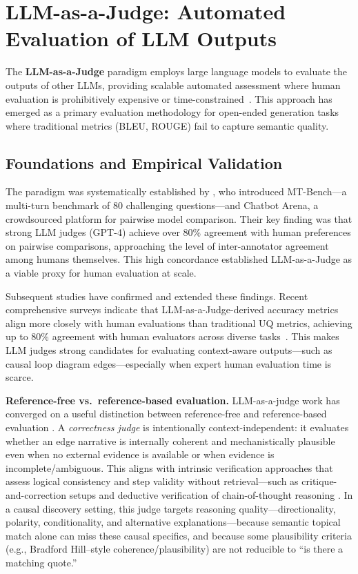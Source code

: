 
\section{LLM-as-a-Judge: Automated Evaluation of LLM Outputs}
\label{sec:lit_llm_as_judge}

The \textbf{LLM-as-a-Judge} paradigm employs large language models to evaluate the outputs of other LLMs, providing scalable automated assessment where human evaluation is prohibitively expensive or time-constrained~\citep{zheng2024judging}. This approach has emerged as a primary evaluation methodology for open-ended generation tasks where traditional metrics (BLEU, ROUGE) fail to capture semantic quality.

\subsection{Foundations and Empirical Validation}

The paradigm was systematically established by \citet{zheng2024judging}, who introduced MT-Bench---a multi-turn benchmark of 80 challenging questions---and Chatbot Arena, a crowdsourced platform for pairwise model comparison. Their key finding was that strong LLM judges (GPT-4) achieve over 80\% agreement with human preferences on pairwise comparisons, approaching the level of inter-annotator agreement among humans themselves. This high concordance established LLM-as-a-Judge as a viable proxy for human evaluation at scale.

Subsequent studies have confirmed and extended these findings. Recent comprehensive surveys indicate that LLM-as-a-Judge-derived accuracy metrics align more closely with human evaluations than traditional UQ metrics, achieving up to 80\% agreement with human evaluators across diverse tasks~\citep{li2024llmsjudges}. This makes LLM judges strong candidates for evaluating context-aware outputs---such as causal loop diagram edges---especially when expert human evaluation time is scarce.

\textbf{Reference-free vs.\ reference-based evaluation.} LLM-as-a-judge work has converged on a useful distinction between reference-free and reference-based evaluation \citep{li2024generation, zheng2023judging}. A \emph{correctness judge} is intentionally context-independent: it evaluates whether an edge narrative is internally coherent and mechanistically plausible even when no external evidence is available or when evidence is incomplete/ambiguous. This aligns with intrinsic verification approaches that assess logical consistency and step validity without retrieval---such as critique-and-correction setups \citep{lin2024criticbench} and deductive verification of chain-of-thought reasoning \citep{ling2023deductive}. In a causal discovery setting, this judge targets reasoning quality---directionality, polarity, conditionality, and alternative explanations---because semantic topical match alone can miss these causal specifics, and because some plausibility criteria (e.g., Bradford Hill--style coherence/plausibility) are not reducible to ``is there a matching quote.''

